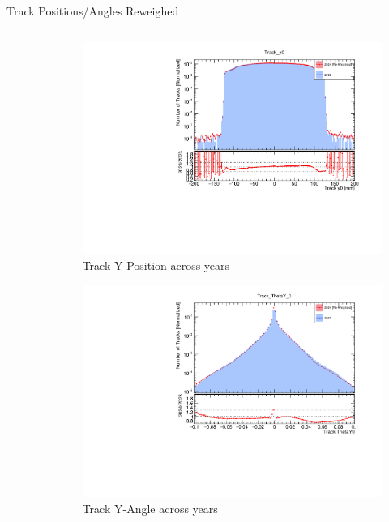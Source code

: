 \begin{frame}{Track Positions/Angles Reweighed}
\begin{columns}
\begin{column}{0.5\linewidth}
\begin{figure}
            \end{figure}
        \end{column}
        \begin{column}{0.5\linewidth}
            \vspace{-0.4cm}
            \begin{figure}
                \includegraphics[width=\linewidth]{./ReweighedPlots/Track_y0_Reweighted.pdf}
                \caption{Track Y-Position across years}
            \end{figure}
            \vspace{-1cm}
            \begin{figure}
                \includegraphics[width=\linewidth]{./ReweighedPlots/Track_ThetaY_0_Reweighted.pdf}
                \caption{Track Y-Angle across years}
            \end{figure}
        \end{column}
    \end{columns}
\end{frame}

